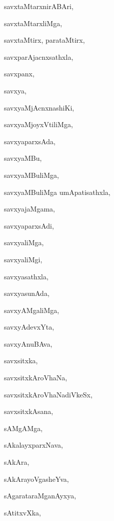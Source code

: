 \begin{multicols}{2}
{savxtaMtarxnirABAri}, \pageref{savxtaMtarxnirABAri}

{savxtaMtarxliMga}, \pageref{savxtaMtarxliMga}

{savxtaMtirx, parataMtirx}, \pageref{savxtaMtirx, parataMtirx}

{savxparAjacnxsathxla}, \pageref{savxparAjacnxsathxla}

{savxpanx}, \pageref{savxpanx}

{savxya}, \pageref{savxya}

{savxyaMjAcnxnashiKi}, \pageref{savxyaMjAcnxnashiKi}

{savxyaMjoyxVtiliMga}, \pageref{savxyaMjoyxVtiliMga}

{savxyaparxsAda}, \pageref{savxyaparxsAda}

{savxyaMBu}, \pageref{savxyaMBu}

{savxyaMBuliMga}, \pageref{savxyaMBuliMga}

{savxyaMBuliMga umApatisathxla}, \pageref{savxyaMBuliMgaumApatisathxla}

{savxyajaMgama}, \pageref{savxyajaMgama}

{savxyaparxsAdi}, \pageref{savxyaparxsAdi}

{savxyaliMga}, \pageref{savxyaliMga}

{savxyaliMgi}, \pageref{savxyaliMgi}

{savxyasathxla}, \pageref{savxyasathxla}

{savxyasunAda}, \pageref{savxyasunAda}

{savxyAMgaliMga}, \pageref{savxyAMgaliMga}

{savxyAdevxYta}, \pageref{savxyAdevxYta}

{savxyAnuBAva}, \pageref{savxyAnuBAva}

{savxsitxka}, \pageref{savxsitxka}

{savxsitxkAroVhaNa}, \pageref{savxsitxkAroVhaNa}

{savxsitxkAroVhaNadiVkeSx}, \pageref{savxsitxkAroVhaNadiVkeSx}

{savxsitxkAsana}, \pageref{savxsitxkAsana}

{sAMgAMga}, \pageref{sAMgAMga}

{sAkalayxparxNava}, \pageref{sAkalayxparxNava}

{sAkAra}, \pageref{sAkAra}

{sAkArayoVgasheYva}, \pageref{sAkArayoVgasheYva}

{sAgarataraMganAyxya}, \pageref{sAgarataraMganAyxya}

{sAtitxvXka}, \pageref{sAtitxvXka}


\end{multicols}

